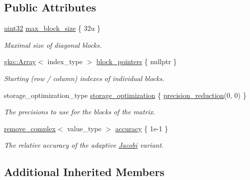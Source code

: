 \subsection*{Public Attributes}
\begin{DoxyCompactItemize}
\item 
\hyperlink{namespacegko_a318c831e3fe269ba04c6ed8bf5a71073}{uint32} \hyperlink{structgko_1_1preconditioner_1_1Jacobi_1_1parameters__type_a7d11d10b347b25b64b5b916e6a74364e}{max\+\_\+block\+\_\+size} \{ 32u \}
\begin{DoxyCompactList}\small\item\em Maximal size of diagonal blocks. \end{DoxyCompactList}\item 
\hyperlink{classgko_1_1Array}{gko\+::\+Array}$<$ index\+\_\+type $>$ \hyperlink{structgko_1_1preconditioner_1_1Jacobi_1_1parameters__type_ab70db5d25c2efd13579170b28218ea66}{block\+\_\+pointers} \{ nullptr \}
\begin{DoxyCompactList}\small\item\em Starting (row / column) indexes of individual blocks. \end{DoxyCompactList}\item 
storage\+\_\+optimization\+\_\+type \hyperlink{structgko_1_1preconditioner_1_1Jacobi_1_1parameters__type_a51d0eec65f99d6dd5b0ebe5ba69390dd}{storage\+\_\+optimization} \{ \hyperlink{classgko_1_1precision__reduction}{precision\+\_\+reduction}(0, 0) \}
\begin{DoxyCompactList}\small\item\em The precisions to use for the blocks of the matrix. \end{DoxyCompactList}\item 
\hyperlink{namespacegko_adfcb75c44f6b6c701989419c166f6e7e}{remove\+\_\+complex}$<$ value\+\_\+type $>$ \hyperlink{structgko_1_1preconditioner_1_1Jacobi_1_1parameters__type_ad4fd0de7ce4d390584e947afb6d0ce73}{accuracy} \{ 1e-\/1 \}
\begin{DoxyCompactList}\small\item\em The relative accuracy of the adaptive \hyperlink{classgko_1_1preconditioner_1_1Jacobi}{Jacobi} variant. \end{DoxyCompactList}\end{DoxyCompactItemize}
\subsection*{Additional Inherited Members}


